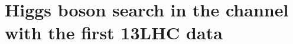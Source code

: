 \chapter{Higgs boson search in the \hww channel with the first 13\TeV LHC data}\label{chap5}
\thispagestyle{empty}





